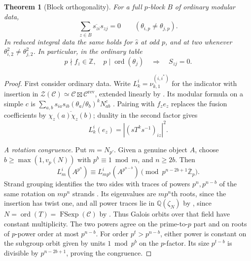 \documentclass[11pt,a4paper]{article}
\numberwithin{equation}{section}
\newtheorem{theorem}{Theorem}[section]
\theoremstyle{remark}
\newcommand{\C}{\mathcal C}
\newcommand{\Z}{\mathcal Z}
\newcommand{\rev}{\mathrm{rev}}
\newcommand{\ZZ}{\mathbb Z}
\newcommand{\QQ}{\mathbb Q}
\DeclareMathOperator{\ord}{ord}
\begin{document}
\begin{theorem}[Block orthogonality]\label{fam:M:3.1}\label{thm:block}\label{thm:zero}\label{lem:reduced-block}\label{lem:reduced-two-block}
For a full $p$-block $B$ of ordinary modular data,
\[
 \sum_{z\in B}\overline{s_{zi}}s_{zj}=0
       \qquad(\theta_{i,p}\ne\theta_{j,p}).
\]
In reduced integral data the same holds for $\widehat s$ at odd $p$,
and at two whenever $\theta_{i,2}^2\ne\theta_{j,2}^2$.
In particular, in the ordinary table
\begin{equation}\label{eq:zero}
 p\nmid f_z\in\ZZ,\quad p\mid\ord(\theta_j)
       \quad\Longrightarrow\quad S_{zj}=0 .
\end{equation}
\end{theorem}
\begin{proof}
First consider ordinary data. Write $L_k^i=\nu_{k,1}^{(i,i^*)}$
for the indicator with insertion in
$\Z(\C)\simeq\C\boxtimes\C^{\rev}$, extended linearly by
\cite[Corollary~5.5]{NSind}. Its modular formula on a simple $c$ is
$\sum_{a,b}s_{ia}s_{ib}(\theta_a/\theta_b)^kN_{ab}^c$
\cite[Proposition~6.1]{NSind}. Pairing with $f_ze_z$ replaces the
fusion coefficients by $\overline{\chi_z(a)\chi_z(b)}$;
duality in the second factor gives
\begin{equation}\label{eq:indicator-entry}
 L_k^i(e_z)=|(sT^ks^{-1})_{iz}|^2 .
\end{equation}

\emph{A rotation congruence.}
Put $m=N_{p'}$. Given a genuine object $A$, choose
$b\ge\max(1,v_p(N))$ with $p^b\equiv1\bmod m$, and $n\ge2b$.
Then
\begin{equation}\label{eq:large-power}
 L_m^i(A^{p^n})\equiv L_{mp^b}^i(A^{p^{n-b}})
              \pmod {p^{n-2b+1}\overline{\ZZ}_p}.
\end{equation}
Strand grouping identifies the two sides with traces of powers
$p^n,p^{n-b}$ of the same rotation on $mp^n$ strands
\cite[Lemmas~2.5, 2.7 and Proposition~2.8(ii)]{NSind}. Its
eigenvalues are $mp^n$th roots, since the insertion has twist one,
and all power traces lie in $\QQ(\zeta_N)$
by \cite[Proposition~5.7]{NSind}, since $N=\ord(T)=\operatorname{FSexp}(\C)$ by \cite[Theorem~7.7]{NSfs}. Thus Galois orbits over that field
have constant multiplicity. The two powers agree on the
prime-to-$p$ part and on roots of $p$-power order at most $p^{n-b}$.
For order $p^t>p^{n-b}$, either power is constant on the subgroup
orbit given by units $1\bmod p^b$ on the $p$-factor. Its size
$p^{t-b}$ is divisible by $p^{n-2b+1}$, proving the congruence.


\end{proof}
\end{document}
